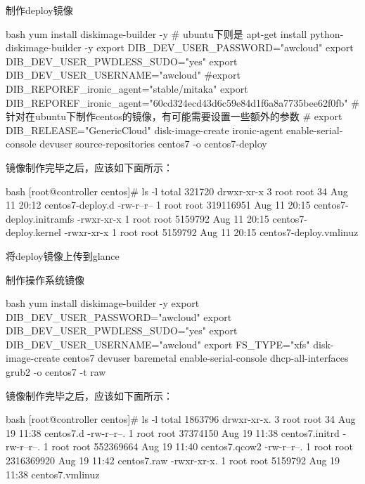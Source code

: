 制作deploy镜像
\begin{code-block}{bash}
yum install diskimage-builder -y
# ubuntu下则是 apt-get install python-diskimage-builder -y
export DIB_DEV_USER_PASSWORD="awcloud"
export DIB_DEV_USER_PWDLESS_SUDO="yes"
export DIB_DEV_USER_USERNAME="awcloud"
#export DIB_REPOREF_ironic_agent="stable/mitaka"
export DIB_REPOREF_ironic_agent="60cd324ecd43d6c59e84d1f6a8a7735bee62f0fb"
# 针对在ubuntu下制作centos的镜像，有可能需要设置一些额外的参数
# export DIB_RELEASE="GenericCloud"
disk-image-create ironic-agent enable-serial-console devuser source-repositories centos7 -o centos7-deploy
\end{code-block}
镜像制作完毕之后，应该如下面所示：
\begin{code-block}{bash}
[root@controller centos]# ls -l
total 321720
drwxr-xr-x 3 root root        34 Aug 11 20:12 centos7-deploy.d
-rw-r--r-- 1 root root 319116951 Aug 11 20:15 centos7-deploy.initramfs
-rwxr-xr-x 1 root root   5159792 Aug 11 20:15 centos7-deploy.kernel
-rwxr-xr-x 1 root root   5159792 Aug 11 20:15 centos7-deploy.vmlinuz
\end{code-block}

将deploy镜像上传到glance

制作操作系统镜像
\begin{code-block}{bash}
yum install diskimage-builder -y
export DIB_DEV_USER_PASSWORD="awcloud"
export DIB_DEV_USER_PWDLESS_SUDO="yes"
export DIB_DEV_USER_USERNAME="awcloud"
export FS_TYPE="xfs"
disk-image-create centos7 devuser baremetal enable-serial-console dhcp-all-interfaces grub2 -o centos7 -t raw
\end{code-block}

镜像制作完毕之后，应该如下面所示：
\begin{code-block}{bash}
[root@controller centos]# ls -l
total 1863796
drwxr-xr-x. 3 root root         34 Aug 19 11:38 centos7.d
-rw-r--r--. 1 root root   37374150 Aug 19 11:38 centos7.initrd
-rw-r--r--. 1 root root  552369664 Aug 19 11:40 centos7.qcow2
-rw-r--r--. 1 root root 2316369920 Aug 19 11:42 centos7.raw
-rwxr-xr-x. 1 root root    5159792 Aug 19 11:38 centos7.vmlinuz
\end{code-block}

